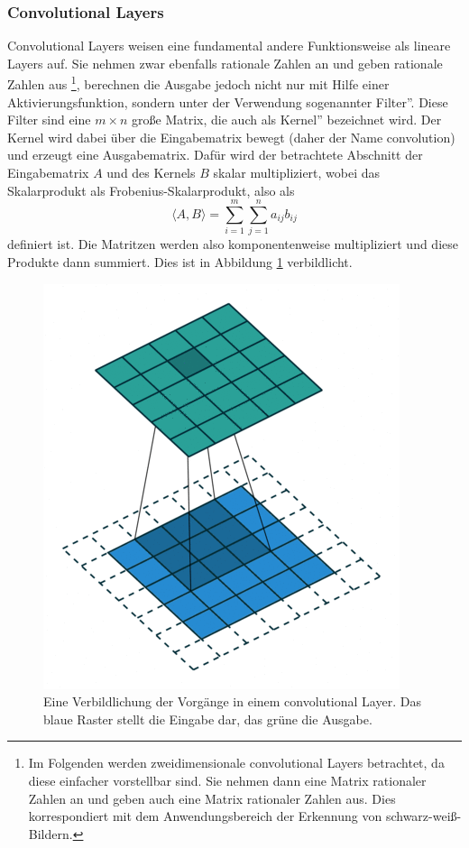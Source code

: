 \documentclass[11pt]{article}
\begin{document}
\subsubsection{Convolutional Layers}
Convolutional Layers weisen eine fundamental andere Funktionsweise als lineare Layers auf. Sie nehmen zwar ebenfalls rationale Zahlen an und geben rationale Zahlen aus \footnote{Im Folgenden werden zweidimensionale convolutional Layers betrachtet, da diese einfacher vorstellbar sind. Sie nehmen dann eine Matrix rationaler Zahlen an und geben auch eine Matrix rationaler Zahlen aus. Dies korrespondiert mit dem Anwendungsbereich der Erkennung von schwarz-weiß-Bildern.}, berechnen die Ausgabe jedoch nicht nur mit Hilfe einer Aktivierungsfunktion, sondern unter der Verwendung sogenannter \glqq Filter''. Diese Filter sind eine $m\times n$ große Matrix, die auch als \glqq Kernel'' bezeichnet wird. Der Kernel wird dabei über die Eingabematrix bewegt (daher der Name convolution) und erzeugt eine Ausgabematrix. Dafür wird der betrachtete Abschnitt der Eingabematrix $A$ und des Kernels $B$ skalar multipliziert, wobei das Skalarprodukt als Frobenius-Skalarprodukt, also als
\begin{equation*}
	\langle A, B\rangle=\sum_{i=1}^{m}\sum_{j=1}^{n}a_{ij}b_{ij}
\end{equation*} 
definiert ist. Die Matritzen werden also komponentenweise multipliziert und diese Produkte dann summiert.\newline
Dies ist in Abbildung \ref{Convolution_illustration} verbildlicht.
\begin{figure}[h]
	\begin{center}
	\includegraphics[width=0.2\linewidth]{../graphics/conv/conv008.png}
	\end{center}
	\caption[Eine Verbildlichung der Vorgänge in einem convolutional Layer\newline
	Aus einer Animation von\newline
	https://github.com/vdumoulin/conv\_arithmetic/blob/master/README.md\\
	Vincent Dumoulin, Francesco Visin - A guide to convolution arithmetic for deep learning (BibTeX)]{Eine Verbildlichung der Vorgänge in einem convolutional Layer. Das blaue Raster stellt die Eingabe dar, das grüne die Ausgabe.}
	\label{Convolution_illustration}
\end{figure}
\end{document}
